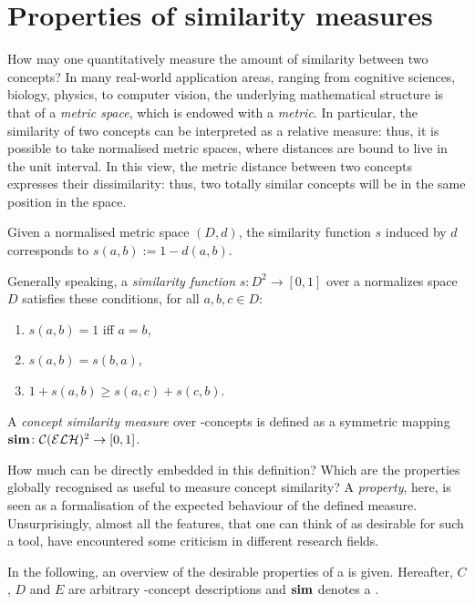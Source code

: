 \section{Properties of similarity measures}
\label{sec:properties}
How may one quantitatively measure the amount of similarity between two concepts?
In many real-world application areas, ranging from cognitive sciences, biology, physics, to computer vision, the underlying mathematical structure is that of a \emph{metric space}, which is endowed with a \emph{metric}.
In particular, the similarity of two concepts can be interpreted as a relative measure: thus, it is possible to take normalised metric spaces, where distances are bound to live in the unit interval.
In this view, the metric distance between two concepts expresses their dissimilarity: thus, two totally similar concepts will be in the same position in the space.

\begin{definition}
  \label{dfn:sim}
  Given a normalised metric space \((D,d)\), the similarity function \(s\) induced by \(d\) corresponds to \(s(a,b) := 1 - d(a,b)\).

  Generally speaking, a \emph{similarity function} \(s \colon D^2 \to [0,1]\) over a normalizes space \(D\) satisfies these conditions, for all \(a,b,c \in D\):
  \begin{enumerate}
    \item \(s(a,b) = 1\) iff \(a = b\),
    \item \(s(a,b) = s(b,a)\),
    \item \(1 + s(a,b) \ge s(a,c) + s(c,b)\).
  \end{enumerate}
  A \emph{concept similarity measure} over \elh-concepts is defined as a symmetric mapping \(\operatorname{\mathbf{sim}} \colon \mathcal{C}(\mathcal{ELH})^2 \to [0,1]\).
\end{definition}

  How much can be directly embedded in this definition?
  Which are the properties globally recognised as useful to measure concept similarity?
  A \emph{property}, here, is seen as a formalisation of the expected behaviour of the defined measure.
  Unsurprisingly, almost all the features, that one can think of as desirable for such a tool, have encountered some criticism in different research fields.

  In the following, an overview of the desirable properties of a \csm is given. Hereafter, \(C\), \(D\) and \(E\) are arbitrary \elh-concept descriptions and \(\operatorname{\mathbf{sim}}\) denotes a \csm.


